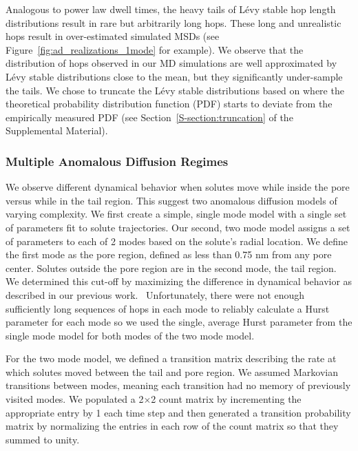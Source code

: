 \documentclass[aps,pre,preprint,groupedaddress,longbibliography]{revtex4-2}
\begin{document}
  Analogous to power law dwell times, the heavy tails of L\'evy stable hop length 
  distributions result in rare but arbitrarily long hops. These long and unrealistic
  hops result in over-estimated simulated MSDs (see Figure~\ref{fig:ad_realizations_1mode}
  for example). We observe that the distribution of hops observed in our MD simulations
  are well approximated by L\'evy stable distributions close to the mean, but they 
  significantly under-sample the tails. We chose to truncate the L\'evy stable distributions
  based on where the theoretical probability distribution function (PDF) starts to 
  deviate from the empirically measured PDF (see Section~\ref{S-section:truncation}
  of the Supplemental Material).~\cite{mantegna_stochastic_1994}

  \subsubsection*{Multiple Anomalous Diffusion Regimes}
  
  We observe different dynamical behavior when solutes move while inside 
  the pore versus while in the tail region. This suggest two anomalous diffusion 
  models of varying complexity. We first create a simple, single mode model with
  a single set of parameters fit to solute trajectories.
  Our second, two mode model assigns a set of parameters to each of 2 modes based
  on the solute's radial location. We define the first mode as the pore region, 
  defined as less than 0.75 nm from any pore center. Solutes outside the pore 
  region are in the second mode, the tail region. We determined this cut-off by
  maximizing the difference in dynamical behavior as 
  described in our previous work.~\cite{coscia_chemically_2019} Unfortunately, 
  there were not enough sufficiently long sequences of hops in each mode to reliably
  calculate a Hurst parameter for each mode so we used the single, average Hurst 
  parameter from the single mode model for both modes of the two mode model.
 
  For the two mode model, we defined a transition matrix describing the rate at
  which solutes moved between the tail and pore region. We assumed Markovian transitions
  between modes, meaning each transition had no memory of previously visited modes. 
  We populated a 2$\times$2 count matrix by incrementing the appropriate entry by 1 
  each time step and then generated a transition probability matrix by normalizing 
  the entries in each row of the count matrix so that they summed to unity.
  
\end{document}

